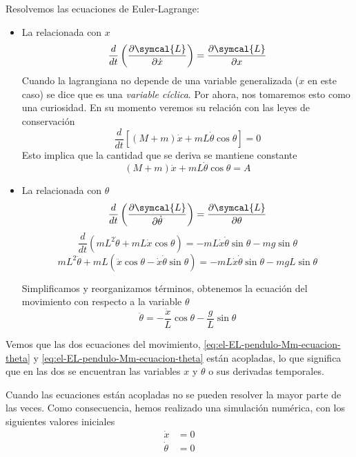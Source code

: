 Resolvemos las ecuaciones de Euler-Lagrange:
\begin{itemize}
\item La relacionada con $x$
  \[
    \frac{d}{dt}\left(\frac{\partial\symcal{L}}{\partial\dot{x}}\right)
    = \frac{\partial\symcal{L}}{\partial x}
  \]
  Cuando la lagrangiana no depende de una variable generalizada ($x$ en este caso)
  se dice que es una \emph{variable cíclica}.
  Por ahora, nos tomaremos esto como una curiosidad. En su momento veremos su relación
  con las leyes de conservación
  \[
    \frac{d}{dt}\left[(M+m)\dot{x}+mL\dot{\theta}\cos\theta\right] = 0
  \]
  Esto implica que la cantidad que se deriva se mantiene constante
  \begin{equation}\label{eq:el-EL-pendulo-Mm-ecuacion-x}
    (M+m)\dot{x}+mL\dot{\theta}\cos\theta = A
  \end{equation}
  
\item La relacionada con $\theta$
  \[
    \frac{d}{dt}\left(\frac{\partial\symcal{L}}{\partial\dot{\theta}}\right)
    = \frac{\partial\symcal{L}}{\partial\theta}
  \]
  \[
    \frac{d}{dt}\left(mL^2\dot{\theta} + mL\dot{x}\cos\theta\right)
    = -mL\dot{x}\dot{\theta}\sin\theta-mg\sin\theta
  \]
  \[
    mL^2\ddot{\theta} + mL\left(\ddot{x}\cos\theta - \dot{x}\dot{\theta}\sin\theta\right)
    = -mL\dot{x}\dot{\theta}\sin\theta-mgL\sin\theta
  \]

  Simplificamos y reorganizamos términos, obtenemos la ecuación del movimiento con respecto a la
  variable $\theta$
  \begin{equation}\label{eq:el-EL-pendulo-Mm-ecuacion-theta}
    \ddot{\theta} = -\frac{\ddot{x}}{L}\cos\theta - \frac{g}{L}\sin\theta
  \end{equation}
\end{itemize}

Vemos que las dos ecuaciones del movimiento, \eqref{eq:el-EL-pendulo-Mm-ecuacion-theta}
y \eqref{eq:el-EL-pendulo-Mm-ecuacion-theta} están acopladas, lo que significa que en
las dos se encuentran las variables $x$ y $\theta$ o sus derivadas temporales.

Cuando las ecuaciones están acopladas no se pueden resolver la mayor parte de las veces.
Como consecuencia, hemos realizado una simulación numérica, con los siguientes
valores iniciales
\begin{align*}
  \dot{x} &= 0\\
  \dot{\theta} &= 0
\end{align*}













